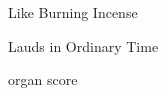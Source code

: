 \documentclass[oneside]{book}
\begin{document}
\null\vfill
\begin{center}
  \huge
  
  Like Burning Incense

  \bigskip\LARGE Lauds in Ordinary Time

  \vfill\vfill\Large organ score

\end{center}
\end{document}
